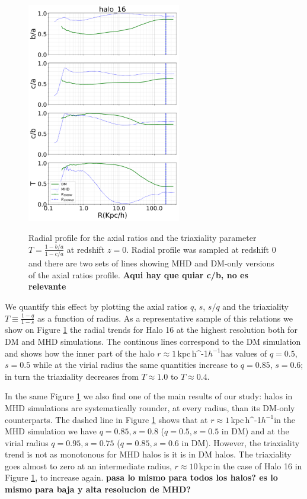 \documentclass[a4paper,fleqn,usenatbib]{mnras}
\newcommand{\kpch}{\,{\rm kpc}\,\ifmmode h^{-1}\else $h^{-1}$\fi}
\newcommand{\kpc}{\,{\rm kpc}\,}
\begin{document}
\begin{figure}
\centering
{\includegraphics[width=0.6\textwidth]{./pics/halo16.png}}
\caption{Radial profile for the axial ratios and the triaxiality parameter
  $T=\frac{1-b/a}{1-c/a}$ at redshift $z=0$. 
  Radial profile was sampled at
  redshift 0 and there are two sets of lines showing MHD and DM-only
  versions of the axial ratios profile. {\bf Aqui hay que quiar c/b,
    no es relevante}} \label{fig:triaxial_radius}
\end{figure} 


We quantify this effect by plotting the axial ratios $q$, $s$,
$s/q$ and the triaxiality $T\equiv \frac{1-q}{1-s}$ as a
function of radius. 
As a representative sample of this relations we show on Figure
\ref{fig:triaxial_radius} the radial trends for Halo 16 at
the highest resolution both for DM and MHD simulations.
The continous lines correspond to the DM simulation and shows how
the inner part of the halo $r\approx 1$\kpch has values of 
$q=0.5$, $s=0.5$ while at the virial radius the same
quantities increase to $q=0.85$, $s=0.6$; in turn the triaxiality
decreases from $T\approx 1.0$ to $T\approx0.4$. 

In the same Figure \ref{fig:triaxial_radius} we also find one of the
main results of our study: halos in MHD simulations are systematically rounder, at
every radius, than its DM-only counterparts.  
The dashed line in Figure \ref{fig:triaxial_radius} shows that at
$r\approx 1$\kpch  in the MHD simulation we have $q=0.85, s=0.8$
($q=0.5, s=0.5$ in DM) and at the virial radius $q=0.95, s=0.75$
($q=0.85, s=0.6$ in DM).  
However, the triaxiality trend is not as monotonous for MHD halos is
it is in DM halos. 
The triaxiality goes almost to zero at an intermediate radius,
$r\approx 10$\kpc in the case of Halo 16 in Figure
\ref{fig:triaxial_radius}, to increase again. {\bf pasa lo mismo para
  todos los halos? es lo mismo para baja y alta resolucion de MHD?}
    
\end{document}
